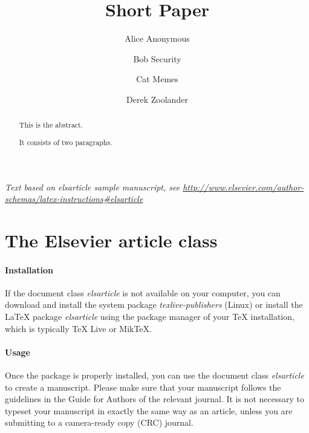 \documentclass[]{elsarticle} %
\begin{document}
\begin{frontmatter}

  \title{Short Paper}
    \author[Some Institute of Technology]{Alice Anonymous}
    \author[Another University]{Bob Security}
    \author[Another University]{Cat Memes}
    \author[Some Institute of Technology]{Derek Zoolander}
      \address[Some Institute of Technology]{Department, Street, City,
State, Zip}
    \address[Another University]{Department, Street, City, State, Zip}
  
  \begin{abstract}
  This is the abstract.

  It consists of two paragraphs.
  \end{abstract}
  
 \end{frontmatter}

\emph{Text based on elsarticle sample manuscript, see
\url{http://www.elsevier.com/author-schemas/latex-instructions\#elsarticle}}

\hypertarget{the-elsevier-article-class}{%
\section{The Elsevier article class}\label{the-elsevier-article-class}}

\hypertarget{installation}{%
\paragraph{Installation}\label{installation}}

If the document class \emph{elsarticle} is not available on your
computer, you can download and install the system package
\emph{texlive-publishers} (Linux) or install the LaTeX package
\emph{elsarticle} using the package manager of your TeX installation,
which is typically TeX Live or MikTeX.

\hypertarget{usage}{%
\paragraph{Usage}\label{usage}}

Once the package is properly installed, you can use the document class
\emph{elsarticle} to create a manuscript. Please make sure that your
manuscript follows the guidelines in the Guide for Authors of the
relevant journal. It is not necessary to typeset your manuscript in
exactly the same way as an article, unless you are submitting to a
camera-ready copy (CRC) journal.
\end{document}

